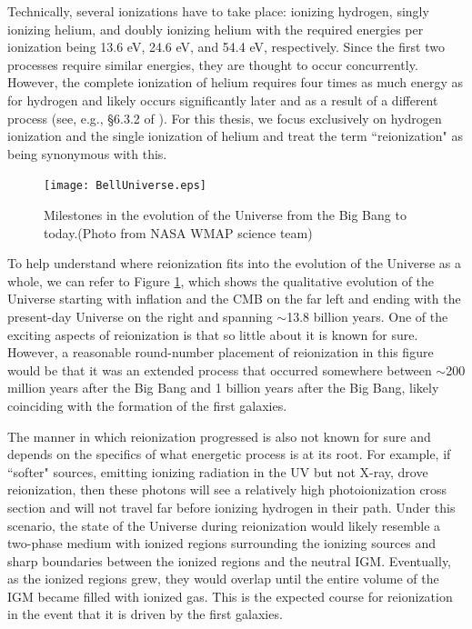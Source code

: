 Technically, several ionizations have to take place: ionizing hydrogen, singly ionizing helium, and doubly ionizing helium with the required energies per ionization being 13.6 eV, 24.6 eV, and 54.4 eV, respectively. Since the first two processes require similar energies, they are thought to occur concurrently. However, the complete ionization of helium requires four times as much energy as for hydrogen and likely occurs significantly later and as a result of a different process (see, e.g., \S 6.3.2 of \citealt{barkana2001beginning}). For this thesis, we focus exclusively on hydrogen ionization and the single ionization of helium and treat the term ``reionization" as being synonymous with this. 


\begin{figure}[!p]
  \centering
  \texttt{[image: BellUniverse.eps]}
  \caption{Milestones in the evolution of the Universe from the Big Bang to today.(Photo from NASA WMAP science team)}
  \label{fig:NASAWMAP}
\end{figure}


To help understand where reionization fits into the evolution of the Universe as a whole, we can refer to Figure \ref{fig:NASAWMAP}, which shows the qualitative evolution of the Universe starting with inflation and the CMB on the far left and ending with the present-day Universe on the right and spanning $\sim$13.8 billion years. One of the exciting aspects of reionization is that so little about it is known for sure. However, a reasonable round-number placement of reionization in this figure would be that it was an extended process that occurred somewhere between $\sim$200 million years after the Big Bang and 1 billion years after the Big Bang, likely coinciding with the formation of the first galaxies. 


The manner in which reionization progressed is also not known for sure and depends on the specifics of what energetic process is at its root. For example, if ``softer" sources, emitting ionizing radiation in the UV but not X-ray, drove reionization, then these photons will see a relatively high photoionization cross section and will not travel far before ionizing hydrogen in their path. Under this scenario, the state of the Universe during reionization would likely resemble a two-phase medium with ionized regions surrounding the ionizing sources and sharp boundaries between the ionized regions and the neutral IGM. Eventually, as the ionized regions grew, they would overlap until the entire volume of the IGM became filled with ionized gas.  This is the expected course for reionization in the event that it is driven by the first galaxies.	


